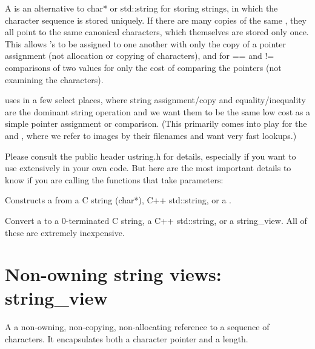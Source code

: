 A \ustring is an alternative to {\cf char*} or {\cf std::string} for storing
strings, in which the character sequence is stored uniquely.  If there are
many copies of the same \ustring, they all point to the same canonical
characters, which themselves are stored only once. This allows \ustring's to
be assigned to one another with only the copy of a pointer assignment (not
allocation or copying of characters), and for {\cf ==} and {\cf !=}
comparisons of two \ustring values for only the cost of comparing the
pointers (not examining the characters).

\OpenImageIO uses \ustring in a few select places, where string
assignment/copy and equality/inequality are the dominant string operation
and we want them to be the same low cost as a simple pointer assignment or
comparison.  (This primarily comes into play for the \ImageCache and
\TextureSystem, where we refer to images by their filenames and want
very fast lookups.)

Please consult the public header {\cf ustring.h} for details, especially if
you want to use \ustring extensively in your own code. But here are the most
important details to know if you are calling the \OpenImageIO functions that
take \ustring parameters:

Constructs a \ustring from a C string ({\cf char*}), C++ {\cf std::string},
or a \stringview.
\apiend

Convert a \ustring to a 0-terminated C string, a C++ {\cf std::string}, or
a {\cf string_view}.  All of these are extremely inexpensive.
\apiend


\section{Non-owning string views: {\cf string_view}}
\label{sec:stringview}

A \stringview a non-owning, non-copying, non-allocating reference to a
sequence of characters.  It encapsulates both a character pointer and a
length.

